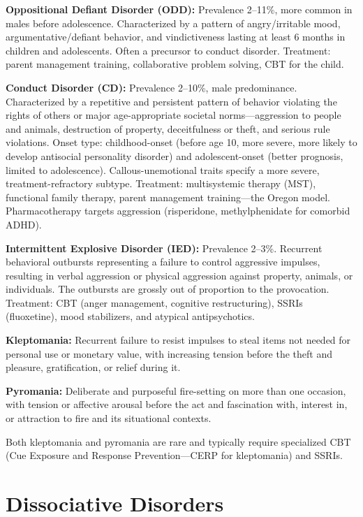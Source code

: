 \textbf{Oppositional Defiant Disorder (ODD):} Prevalence 2--11\%, more common in males before adolescence. Characterized by a pattern of angry/irritable mood, argumentative/defiant behavior, and vindictiveness lasting at least 6 months in children and adolescents. Often a precursor to conduct disorder. Treatment: parent management training, collaborative problem solving, CBT for the child.

\textbf{Conduct Disorder (CD):} Prevalence 2--10\%, male predominance. Characterized by a repetitive and persistent pattern of behavior violating the rights of others or major age-appropriate societal norms---aggression to people and animals, destruction of property, deceitfulness or theft, and serious rule violations. Onset type: childhood-onset (before age 10, more severe, more likely to develop antisocial personality disorder) and adolescent-onset (better prognosis, limited to adolescence). Callous-unemotional traits specify a more severe, treatment-refractory subtype. Treatment: multisystemic therapy (MST), functional family therapy, parent management training---the Oregon model. Pharmacotherapy targets aggression (risperidone, methylphenidate for comorbid ADHD).

\textbf{Intermittent Explosive Disorder (IED):} Prevalence 2--3\%. Recurrent behavioral outbursts representing a failure to control aggressive impulses, resulting in verbal aggression or physical aggression against property, animals, or individuals. The outbursts are grossly out of proportion to the provocation. Treatment: CBT (anger management, cognitive restructuring), SSRIs (fluoxetine), mood stabilizers, and atypical antipsychotics.

\textbf{Kleptomania:} Recurrent failure to resist impulses to steal items not needed for personal use or monetary value, with increasing tension before the theft and pleasure, gratification, or relief during it.

\textbf{Pyromania:} Deliberate and purposeful fire-setting on more than one occasion, with tension or affective arousal before the act and fascination with, interest in, or attraction to fire and its situational contexts.

Both kleptomania and pyromania are rare and typically require specialized CBT (Cue Exposure and Response Prevention---CERP for kleptomania) and SSRIs.

\section{Dissociative Disorders}

